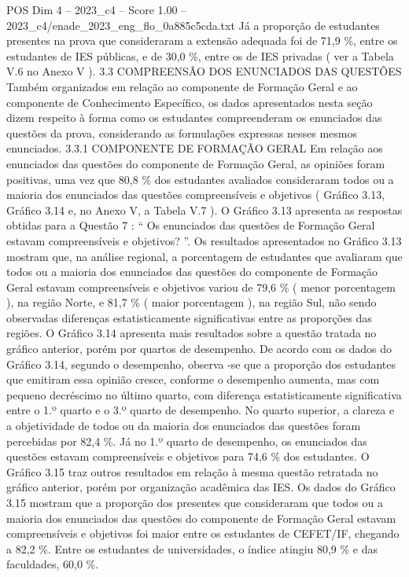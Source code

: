 \begin{textsample}{POS Dim 4 – 2023\_c4 – Score 1.00 – 2023\_c4/enade\_2023\_eng\_flo\_0a885c5cda.txt}
Já a proporção de estudantes presentes na prova que consideraram a extensão adequada foi de 71,9 \%, entre os estudantes de IES públicas, e de 30,0 \%, entre os de IES privadas ( ver a Tabela V.6 no Anexo V ). 3.3 COMPREENSÃO DOS ENUNCIADOS DAS QUESTÕES Também organizados em relação ao componente de Formação Geral e ao componente de Conhecimento Específico, os dados apresentados nesta seção dizem respeito à forma como os estudantes compreenderam os enunciados das questões da prova, considerando as formulações expressas nesses mesmos enunciados. 3.3.1 COMPONENTE DE FORMAÇÃO GERAL Em relação aos enunciados das questões do componente de Formação Geral, as opiniões foram positivas, uma vez que 80,8 \% dos estudantes avaliados consideraram todos ou a maioria dos enunciados das questões compreensíveis e objetivos ( Gráfico 3.13, Gráfico 3.14 e, no Anexo V, a Tabela V.7 ).
O Gráfico 3.13 apresenta as respostas obtidas para a Questão 7 : “ Os enunciados das questões de Formação Geral estavam compreensíveis e objetivos? ”.
Os resultados apresentados no Gráfico 3.13 mostram que, na análise regional, a porcentagem de estudantes que avaliaram que todos ou a maioria dos enunciados das questões do componente de Formação Geral estavam compreensíveis e objetivos variou de 79,6 \% ( menor porcentagem ), na região Norte, e 81,7 \% ( maior porcentagem ), na região Sul, não sendo observadas diferenças estatisticamente significativas entre as proporções das regiões.
O Gráfico 3.14 apresenta mais resultados sobre a questão tratada no gráfico anterior, porém por quartos de desempenho.
De acordo com os dados do Gráfico 3.14, segundo o desempenho, observa -se que a proporção dos estudantes que emitiram essa opinião cresce, conforme o desempenho aumenta, mas com pequeno decréscimo no último quarto, com diferença estatisticamente significativa entre o 1.º quarto e o 3.º quarto de desempenho.
No quarto superior, a clareza e a objetividade de todos ou da maioria dos enunciados das questões foram percebidas por 82,4 \%.
Já no 1.º quarto de desempenho, os enunciados das questões estavam compreensíveis e objetivos para 74,6 \% dos estudantes.
O Gráfico 3.15 traz outros resultados em relação à mesma questão retratada no gráfico anterior, porém por organização acadêmica das IES.
Os dados do Gráfico 3.15 mostram que a proporção dos presentes que consideraram que todos ou a maioria dos enunciados das questões do componente de Formação Geral estavam compreensíveis e objetivos foi maior entre os estudantes de CEFET/IF, chegando a 82,2 \%.
Entre os estudantes de universidades, o índice atingiu 80,9 \% e das faculdades, 60,0 \%.

\end{textsample}
